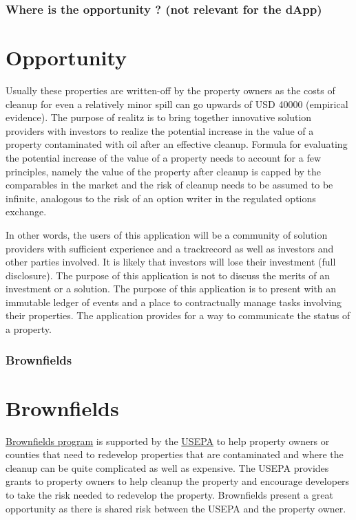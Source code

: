 \documentclass{beamer}
\begin{document}
\begin{frame}
\frametitle{Where is the opportunity ? (not relevant for the dApp)}
\section {Opportunity}
Usually these properties are written-off by the property owners as the costs of cleanup for even a relatively minor spill can go upwards of USD 40000 (empirical evidence). The purpose of realitz is to bring together innovative solution providers with investors to realize the potential increase in the value of a property contaminated with oil after an effective cleanup. Formula for evaluating the potential increase of the value of a property needs to account for a few principles, namely the value of the property after cleanup is capped by the comparables in the market and the risk of cleanup needs to be assumed to be infinite, analogous to the risk of an option writer in the regulated options exchange. 

In other words, the users of this application will be a community of solution providers with sufficient experience and a trackrecord as well as investors and other parties involved. It is likely that investors will lose their investment (full disclosure). The purpose of this application is not to discuss the merits of an investment or a solution. The purpose of this application is to present with an immutable ledger of events and a place to contractually manage tasks involving their properties. The application provides for a way to communicate the status of a property.


\end{frame}
\begin{frame}
\frametitle{Brownfields}
\section{Brownfields} \label{brownfields}
   \href{https://www.epa.gov/brownfields/overview-brownfields-program} {Brownfields program} is supported by the \href{https://www.epa.gov/} {USEPA} to help property owners or counties that need to redevelop properties that are contaminated and where the cleanup can be quite complicated as well as expensive. The USEPA provides grants to property owners to help cleanup the property and encourage developers to take the risk needed to redevelop the property. Brownfields present a great opportunity as there is shared risk between the USEPA and the property owner. 
\end{frame}
\end{document}
